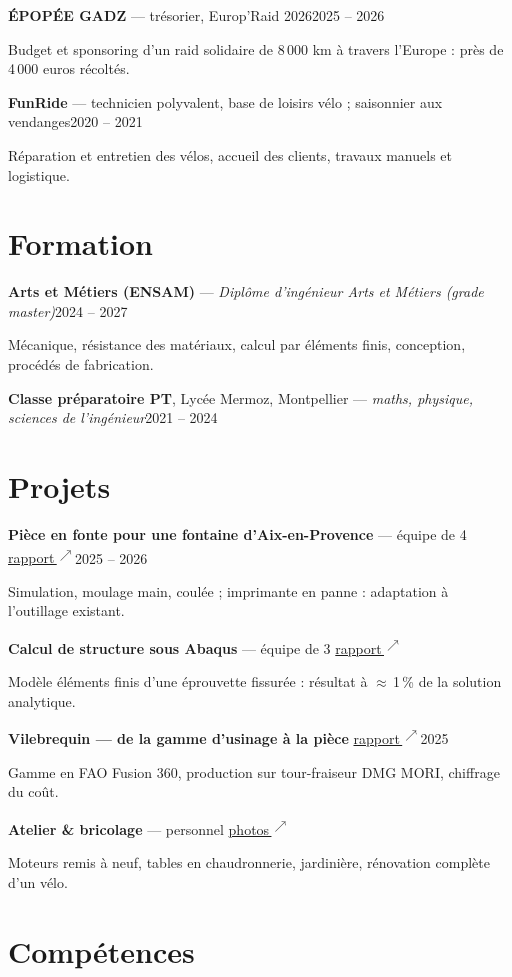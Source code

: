 \documentclass[10pt,a4paper]{article}
\newcommand{\lk}{\,\textsuperscript{$\nearrow$}}
\newcommand{\link}[2]{\href{#1}{#2\lk}}
\newcommand{\entry}[2]{\par\vspace{0.5em}#1\hfill #2\par}
\begin{document}
\entry{\textbf{ÉPOPÉE GADZ} --- trésorier, Europ'Raid 2026}{2025 -- 2026}
Budget et sponsoring d'un raid solidaire de 8\,000 km à travers l'Europe : près de 4\,000 euros récoltés.

\entry{\textbf{FunRide} --- technicien polyvalent, base de loisirs vélo \textnormal{; saisonnier aux vendanges}}{2020 -- 2021}
Réparation et entretien des vélos, accueil des clients, travaux manuels et logistique.

\section{Formation}

\entry{\textbf{Arts et Métiers (ENSAM)} --- \textit{Diplôme d'ingénieur Arts et Métiers (grade master)}}{2024 -- 2027}
Mécanique, résistance des matériaux, calcul par éléments finis, conception, procédés de fabrication.

\entry{\textbf{Classe préparatoire PT}, Lycée Mermoz, Montpellier --- \textit{maths, physique, sciences de l'ingénieur}}{2021 -- 2024}

\section{Projets}

\entry{\textbf{Pièce en fonte pour une fontaine d'Aix-en-Provence} --- équipe de 4 \quad\link{https://gauthierbonhomme.com/fonderie.html}{rapport}}{2025 -- 2026}
Simulation, moulage main, coulée ; imprimante en panne : adaptation à l'outillage existant.

\entry{\textbf{Calcul de structure sous Abaqus} --- équipe de 3 \quad\link{https://gauthierbonhomme.com/abaqus.html}{rapport}}{}
Modèle éléments finis d'une éprouvette fissurée : résultat à $\approx$\,1\,\% de la solution analytique.

\entry{\textbf{Vilebrequin --- de la gamme d'usinage à la pièce} \quad\link{https://gauthierbonhomme.com/usinage.html}{rapport}}{2025}
Gamme en FAO Fusion 360, production sur tour-fraiseur DMG MORI, chiffrage du coût.

\entry{\textbf{Atelier \& bricolage} --- personnel \quad\link{https://gauthierbonhomme.com/projet.html?id=projets-divers-et-varies}{photos}}{}
Moteurs remis à neuf, tables en chaudronnerie, jardinière, rénovation complète d'un vélo.

\section{Compétences}
\end{document}
